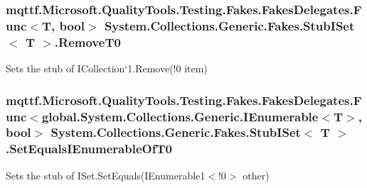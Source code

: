 \hypertarget{class_system_1_1_collections_1_1_generic_1_1_fakes_1_1_stub_i_set_3_01_t_01_4_a68dad22dc2fc683b216cee8cbef4983d}{
\subsubsection[{Remove\-T0}]{\setlength{\rightskip}{0pt plus 5cm}mqttf.\-Microsoft.\-Quality\-Tools.\-Testing.\-Fakes.\-Fakes\-Delegates.\-Func$<$T, bool$>$ System.\-Collections.\-Generic.\-Fakes.\-Stub\-I\-Set$<$ T $>$.Remove\-T0}}\label{class_system_1_1_collections_1_1_generic_1_1_fakes_1_1_stub_i_set_3_01_t_01_4_a68dad22dc2fc683b216cee8cbef4983d}


Sets the stub of I\-Collection`1.Remove(!0 item)

\hypertarget{class_system_1_1_collections_1_1_generic_1_1_fakes_1_1_stub_i_set_3_01_t_01_4_a4651276d9af1c5304b561e3ddfa8b12e}{
\subsubsection[{Set\-Equals\-I\-Enumerable\-Of\-T0}]{\setlength{\rightskip}{0pt plus 5cm}mqttf.\-Microsoft.\-Quality\-Tools.\-Testing.\-Fakes.\-Fakes\-Delegates.\-Func$<$global.\-System.\-Collections.\-Generic.\-I\-Enumerable$<$T$>$, bool$>$ System.\-Collections.\-Generic.\-Fakes.\-Stub\-I\-Set$<$ T $>$.Set\-Equals\-I\-Enumerable\-Of\-T0}}\label{class_system_1_1_collections_1_1_generic_1_1_fakes_1_1_stub_i_set_3_01_t_01_4_a4651276d9af1c5304b561e3ddfa8b12e}


Sets the stub of I\-Set{.\-Set\-Equals(I\-Enumerable}1$<$!0$>$ other)

